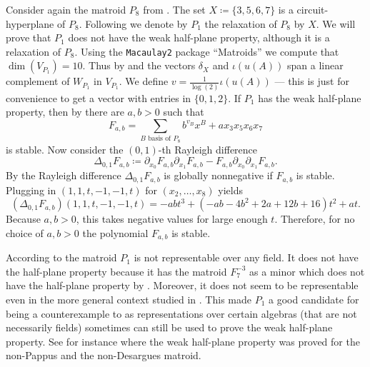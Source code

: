 \begin{ex}\label{ex:counterrelax}
    Consider again the matroid $P_8$ from . The set $X\coloneqq \{3,5,6,7\}$ is a circuit-hyperplane of $P_8$. Following \cite{ninematroids} we denote by $P_1$ the relaxation of $P_8$ by $X$. We will prove that $P_1$ does not have the weak half-plane property, although it is a relaxation of $P_8$.    
    Using the {\texttt{Macaulay2}} \cite{M2} package ``Matroids'' \cite{MatroidsArticle} we compute that $\dim(V_{P_1})=10$. Thus by  and  the vectors $\delta_X$ and $\iota(u(A))$ span a linear complement of $W_{P_1}$ in $V_{P_1}$. We define $v=\frac{1}{\log(2)}\iota(u(A))$ --- this is just for convenience to get a vector with entries in $\{0,1,2\}$. If $P_1$ has the weak half-plane property, then by  there are $a,b>0$ such that
    \begin{equation*}
        F_{a,b}=\sum_{B\text{ basis of }P_8}b^{v_B}x^B+ax_3x_5x_6x_7
    \end{equation*}
    is stable. Now consider the $(0,1)$-th Rayleigh difference
    \begin{equation*}
      \Delta_{0,1}F_{a,b}\coloneqq \partial_{x_0}F_{a,b}\partial_{x_1}F_{a,b}-F_{a,b}\partial_{x_0}\partial_{x_1}F_{a,b}.  
    \end{equation*}
    By \cite[Theorem~5.10]{BrandenHPP} the Rayleigh difference $\Delta_{0,1}F_{a,b}$ is globally nonnegative if $F_{a,b}$ is stable. Plugging in $(1,1,t,-1,-1,t)$ for $(x_2,\ldots,x_8)$ yields
    \begin{equation*}
      (\Delta_{0,1}F_{a,b})(1,1,t,-1,-1,t)=-abt^3+(-ab-4b^2+2a+12b+16)t^2+at.  
    \end{equation*}
     Because $a,b>0$, this takes negative values for large enough $t$. Therefore, for no choice of $a,b>0$ the polynomial $F_{a,b}$ is stable.
    
\end{ex}

\begin{rem}
    According to \cite[Proposition~4]{ninematroids} the matroid $P_1$ is not representable over any field. It does not have the half-plane property because it has the matroid $F_7^{-3}$ as a minor which does not have the half-plane property by \cite[Example~11.7]{HPPlong}. Moreover, it does not seem to be representable even in the more general context studied in \cite{skewpartial}. This made $P_1$ a good candidate for being a counterexample to  as representations over certain algebras (that are not necessarily fields) sometimes can still be used to prove the weak half-plane property. See for instance \cite{NonPappus} where the weak half-plane property was proved for the non-Pappus and  the non-Desargues matroid.
\end{rem}


